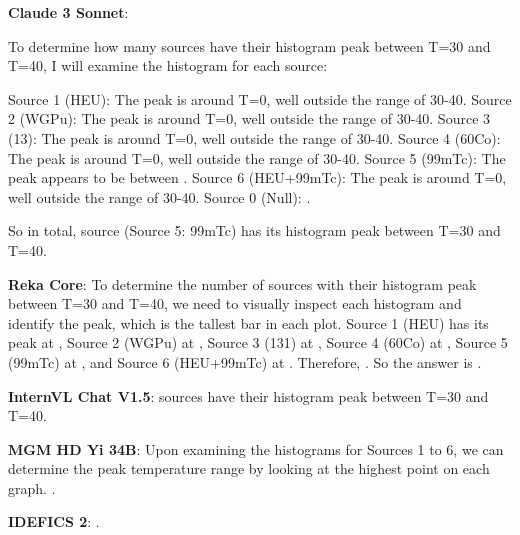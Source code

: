\begin{wronganswer}
\textbf{Claude 3 Sonnet}: \small{To determine how many sources have their histogram peak between T=30 and T=40, I will examine the histogram for each source:

Source 1 (HEU): The peak is around T=0, well outside the range of 30-40.
Source 2 (WGPu): The peak is around T=0, well outside the range of 30-40. 
Source 3 (13): The peak is around T=0, well outside the range of 30-40.
Source 4 (60Co): The peak is around T=0, well outside the range of 30-40.
Source 5 (99mTc): The peak appears to be between .
Source 6 (HEU+99mTc): The peak is around T=0, well outside the range of 30-40.
Source 0 (Null): .

So in total,  source (Source 5: 99mTc) has its histogram peak between T=30 and T=40.}
\end{wronganswer}

\begin{wronganswer}
\textbf{Reka Core}: \small{ To determine the number of sources with their histogram peak between T=30 and T=40, we need to visually inspect each histogram and identify the peak, which is the tallest bar in each plot. Source 1 (HEU) has its peak at , Source 2 (WGPu) at , Source 3 (131) at , Source 4 (60Co) at , Source 5 (99mTc) at , and Source 6 (HEU+99mTc) at . Therefore, . So the answer is .}
\end{wronganswer}

\begin{wronganswer}
\textbf{InternVL Chat V1.5}: \small{ sources have their histogram peak between T=30 and T=40.}
\end{wronganswer}

\begin{wronganswer}
\textbf{MGM HD Yi 34B}: \small{Upon examining the histograms for Sources 1 to 6, we can determine the peak temperature range by looking at the highest point on each graph. .}
\end{wronganswer}

\begin{wronganswer}
\textbf{IDEFICS 2}: \small{.}
\end{wronganswer}
\newpage
